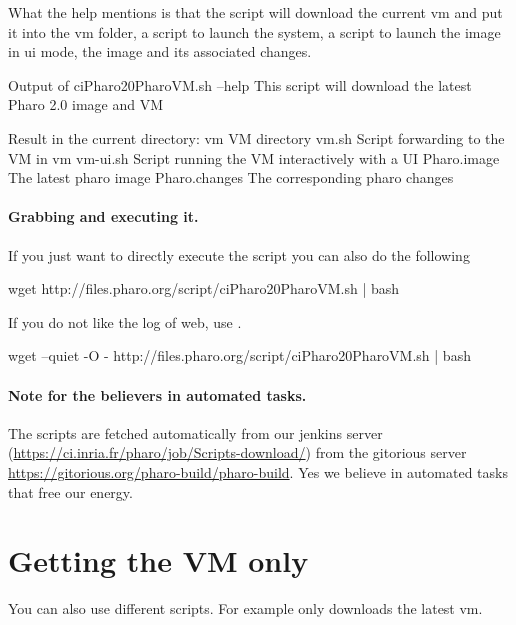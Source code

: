 \documentclass[a4paper,10pt,twoside]{book}
\begin{document}
What the help mentions is that the script will download the current vm and put it into the vm folder,  a script to launch the system, 
 a script to launch the image in ui mode, the image and its associated changes. 

\begin{code}{Output of ciPharo20PharoVM.sh --help }
This script will download the latest Pharo 2.0 image and VM

Result in the current directory:
    vm            VM directory
    vm.sh            Script forwarding to the VM in vm
    vm-ui.sh            Script running the VM interactively with a UI
    Pharo.image            The latest pharo image
    Pharo.changes            The corresponding pharo changes
\end{code}



\paragraph{Grabbing and executing it.}
If you just want to directly execute the script you can also do the following

\begin{code}{}
wget http://files.pharo.org/script/ciPharo20PharoVM.sh | bash
\end{code}

If you do not like the log of web, use .

\begin{code}{}
wget --quiet -O - http://files.pharo.org/script/ciPharo20PharoVM.sh | bash
\end{code}

\paragraph{Note for the believers in automated tasks.} The scripts are fetched automatically from 
our jenkins server (\url{https://ci.inria.fr/pharo/job/Scripts-download/}) from the gitorious server \url{https://gitorious.org/pharo-build/pharo-build}.
Yes we believe in automated tasks that free our energy. 



\section{Getting the VM only}
You can also use different scripts. For example  only downloads the latest vm.
\end{document}
